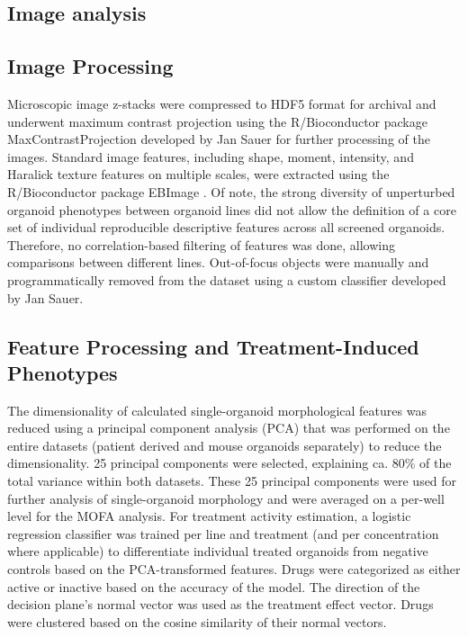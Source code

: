 \begin{flushleft}
\section{Image analysis}

\subsection{Image Processing}
Microscopic image z-stacks were compressed to HDF5 format for archival and underwent maximum contrast projection using the R/Bioconductor package MaxContrastProjection developed by Jan Sauer for further processing of the images. Standard image features, including shape, moment, intensity, and Haralick texture features on multiple scales, were extracted using the R/Bioconductor package EBImage \parencite{pauEBImagePackageImage2010}. Of note, the strong diversity of unperturbed organoid phenotypes between organoid lines did not allow the definition of a core set of individual reproducible descriptive features across all screened organoids. Therefore, no correlation-based filtering of features was done, allowing comparisons between different lines. Out-of-focus objects were manually and programmatically removed from the dataset using a custom classifier developed by Jan Sauer.

\subsection{Feature Processing and Treatment-Induced Phenotypes}
The dimensionality of calculated single-organoid morphological features was reduced using a principal component analysis (PCA) that was performed on the entire datasets (patient derived and mouse organoids separately) to reduce the dimensionality. 25 principal components were selected, explaining ca. 80\% of the total variance within both datasets. These 25 principal components were used for further analysis of single-organoid morphology and were averaged on a per-well level for the MOFA analysis.
\bigbreak
For treatment activity estimation, a logistic regression classifier was trained per line and treatment (and per concentration where applicable) to differentiate individual treated organoids from negative controls based on the PCA-transformed features. Drugs were categorized as either active or inactive based on the accuracy of the model. The direction of the decision plane's normal vector was used as the treatment effect vector. Drugs were clustered based on the cosine similarity of their normal vectors.



\end{flushleft}
